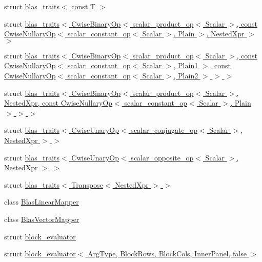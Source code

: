 \begin{DoxyCompactItemize}
struct \hyperlink{struct_eigen_1_1internal_1_1blas__traits_3_01const_01_t_01_4}{blas\+\_\+traits$<$ const T $>$}
\item 
struct \hyperlink{struct_eigen_1_1internal_1_1blas__traits_3_01_cwise_binary_op_3_01scalar__product__op_3_01_scala460c90a32ed86eb7afe907bd9f50947d}{blas\+\_\+traits$<$ Cwise\+Binary\+Op$<$ scalar\+\_\+product\+\_\+op$<$ Scalar $>$, const Cwise\+Nullary\+Op$<$ scalar\+\_\+constant\+\_\+op$<$ Scalar $>$, Plain $>$, Nested\+Xpr $>$ $>$}
\item 
struct \hyperlink{struct_eigen_1_1internal_1_1blas__traits_3_01_cwise_binary_op_3_01scalar__product__op_3_01_scala720e6aa72051d527ea4818c5301d9b21}{blas\+\_\+traits$<$ Cwise\+Binary\+Op$<$ scalar\+\_\+product\+\_\+op$<$ Scalar $>$, const Cwise\+Nullary\+Op$<$ scalar\+\_\+constant\+\_\+op$<$ Scalar $>$, Plain1 $>$, const Cwise\+Nullary\+Op$<$ scalar\+\_\+constant\+\_\+op$<$ Scalar $>$, Plain2 $>$ $>$ $>$}
\item 
struct \hyperlink{struct_eigen_1_1internal_1_1blas__traits_3_01_cwise_binary_op_3_01scalar__product__op_3_01_scala947462575c60123595df86e5556ae031}{blas\+\_\+traits$<$ Cwise\+Binary\+Op$<$ scalar\+\_\+product\+\_\+op$<$ Scalar $>$, Nested\+Xpr, const Cwise\+Nullary\+Op$<$ scalar\+\_\+constant\+\_\+op$<$ Scalar $>$, Plain $>$ $>$ $>$}
\item 
struct \hyperlink{struct_eigen_1_1internal_1_1blas__traits_3_01_cwise_unary_op_3_01scalar__conjugate__op_3_01_scal305db6e51b207e2ce8fc6ea06996a706}{blas\+\_\+traits$<$ Cwise\+Unary\+Op$<$ scalar\+\_\+conjugate\+\_\+op$<$ Scalar $>$, Nested\+Xpr $>$ $>$}
\item 
struct \hyperlink{struct_eigen_1_1internal_1_1blas__traits_3_01_cwise_unary_op_3_01scalar__opposite__op_3_01_scalabef74274251827708a3725df034ebf7d}{blas\+\_\+traits$<$ Cwise\+Unary\+Op$<$ scalar\+\_\+opposite\+\_\+op$<$ Scalar $>$, Nested\+Xpr $>$ $>$}
\item 
struct \hyperlink{struct_eigen_1_1internal_1_1blas__traits_3_01_transpose_3_01_nested_xpr_01_4_01_4}{blas\+\_\+traits$<$ Transpose$<$ Nested\+Xpr $>$ $>$}
\item 
class \hyperlink{class_eigen_1_1internal_1_1_blas_linear_mapper}{Blas\+Linear\+Mapper}
\item 
class \hyperlink{class_eigen_1_1internal_1_1_blas_vector_mapper}{Blas\+Vector\+Mapper}
\item 
struct \hyperlink{struct_eigen_1_1internal_1_1block__evaluator}{block\+\_\+evaluator}
\item 
struct \hyperlink{struct_eigen_1_1internal_1_1block__evaluator_3_01_arg_type_00_01_block_rows_00_01_block_cols_00_01_inner_panel_00_01false_01_4}{block\+\_\+evaluator$<$ Arg\+Type, Block\+Rows, Block\+Cols, Inner\+Panel, false $>$}

\end{DoxyCompactItemize}
